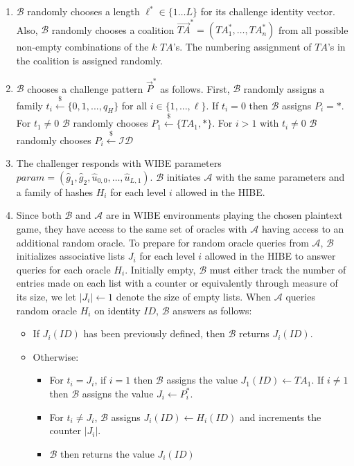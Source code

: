 \documentclass[10pt]{llncs}
\newcommand{\A}{\mathcal{A}}
\newcommand{\B}{\mathcal{B}}
\newcommand{\ID}{\mathit{ID}}
\newcommand{\TA}{\mathit{TA}}
\newcommand{\getsr}{\stackrel{{\scriptscriptstyle\$}}{\gets}}
\begin{document}
\begin{enumerate}
	\item $\B$ randomly chooses a length $\ell^* \in \{1 \ldots L\}$ for its challenge identity vector. Also, $\B$ randomly chooses a coalition $\vec{\TA}^{*} = (\TA^{*}_{1},\ldots,\TA^{*}_{n})$ from all possible non-empty combinations of the $k$ $\TA$'s. The numbering assignment of $\TA$'s in the coalition is assigned randomly.
	\item $\B$ chooses a challenge pattern $\vec{P}^*$ as follows. First, $\B$ randomly assigns a family $t_i \getsr \{0, 1, ..., q_H\}$ for all $i \in \{1, ..., \ell\}$. If $t_i = 0$ then $\B$ assigns $P_i = *$. For $t_1 \neq 0$ $\B$ randomly chooses $P_1 \getsr \{\TA_1, *\}$. For $i > 1$ with $t_i \neq 0$ $\B$ randomly chooses $P_i \getsr \mathcal{ID}$
	\item The challenger responds with WIBE parameters $\mathit{param} = (\hat{g}_{1},\hat{g}_{2},\hat{u}_{0,0},\ldots,\hat{u}_{L,1})$. $\B$ initiates $\A$ with the same parameters and a family of hashes $H_i$ for each level $i$ allowed in the HIBE.
	\item Since both $\B$ and $\A$ are in WIBE environments playing the chosen plaintext game, they have access to the same set of oracles with $\A$ having access to an additional random oracle. To prepare for random oracle queries from $\A$, $\B$ initializes associative lists $J_i$ for each level $i$ allowed in the HIBE to answer queries for each oracle $H_i$. Initially empty, $\B$ must either track the number of entries made on each list with a counter or equivalently through measure of its size, we let $|J_i| \gets 1$ denote the size of empty lists. When $\A$ queries random oracle $H_i$ on identity $\ID$, $\B$ answers as follows:
	\begin{itemize}
		\item If $J_i(\ID)$ has been previously defined, then $\B$ returns $J_i(\ID)$.
		\item Otherwise:
		\begin{itemize}
			\item For $t_i = J_i$, if $i = 1$ then $\B$ assigns the value $J_1(\ID) \gets \TA_1$. If $i \neq 1$ then $\B$ assigns the value $J_i \gets P_i^{*}$.
			\item For $t_i \neq J_i$, $\B$ assigns $J_i(\ID) \gets H_i(\ID)$ and increments the counter $|J_i|$.
			\item $\B$ then returns the value $J_i(\ID)$
		\end{itemize}
	\end{itemize}

\end{enumerate}
\end{document}
